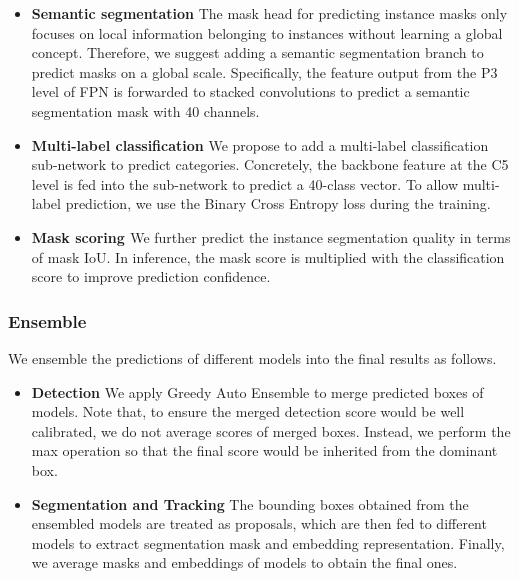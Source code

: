 \documentclass[10pt,twocolumn,letterpaper]{article}
\begin{document}
\begin{itemize}
\item \textbf{Semantic segmentation} The mask head for predicting instance masks only focuses on local information belonging to instances without learning a global concept. Therefore, we suggest adding a semantic segmentation branch to predict masks on a global scale. Specifically, the feature output from the P3 level of FPN is forwarded to stacked convolutions to predict a semantic segmentation mask with 40 channels. 

\item \textbf{Multi-label classification} We propose to add a multi-label classification sub-network to predict categories. Concretely, the backbone feature at the C5 level is fed into the sub-network to predict a 40-class vector. To allow multi-label prediction, we use the Binary Cross Entropy loss during the training.

\item \textbf{Mask scoring \cite{msrcnn}} We further predict the instance segmentation quality in terms of mask IoU. In inference, the mask score is multiplied with the classification score to improve prediction confidence.
\end{itemize} \subsubsection{Ensemble}
\label{sec:ensemble}

We ensemble the predictions of different models into the final results as follows.

\begin{itemize}
\item \textbf{Detection} We apply Greedy Auto Ensemble \cite{greedy} to merge predicted boxes of models. Note that, to ensure the merged detection score would be well calibrated, we do not average scores of merged boxes. Instead, we perform the max operation so that the final score would be inherited from the dominant box.

\item \textbf{Segmentation and Tracking} The bounding boxes obtained from the ensembled models are treated as proposals, which are then fed to different models to extract segmentation mask and embedding representation. Finally, we average masks and embeddings of models to obtain the final ones.

\end{itemize}
\end{document}
